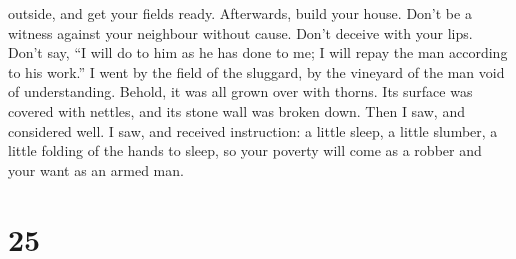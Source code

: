 outside, and get your fields ready. Afterwards, build your house.
 Don't be a witness against your neighbour without cause.
Don't deceive with your lips.  Don't say, ``I will do to
him as he has done to me; I will repay the man according to his work.''
 I went by the field of the sluggard, by the vineyard of
the man void of understanding.  Behold, it was all grown
over with thorns. Its surface was covered with nettles, and its stone
wall was broken down.  Then I saw, and considered well. I
saw, and received instruction:  a little sleep, a little
slumber, a little folding of the hands to sleep,  so your
poverty will come as a robber and your want as an armed man.

\hypertarget{section-20}{%
\section{25}\label{section-20}}

